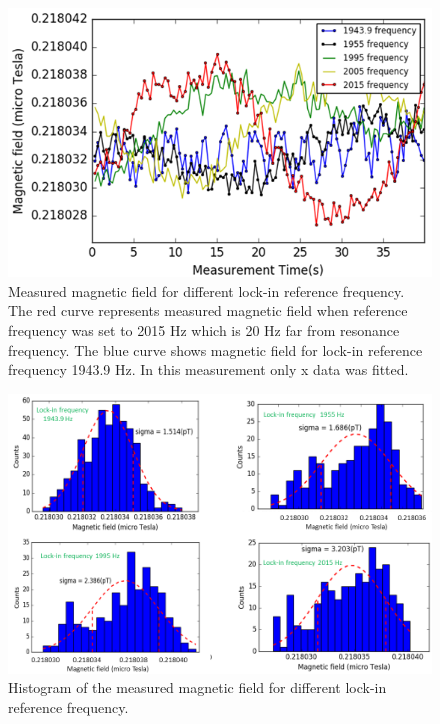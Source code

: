 \begin{figure}[h]
\centering\includegraphics[width=0.8\linewidth]{figures/reference_frequency}
\caption{Measured magnetic field for different lock-in reference frequency. The red curve represents measured magnetic field when reference frequency was set to 2015 Hz which is 20 Hz far from resonance frequency. The blue curve shows magnetic field for lock-in reference frequency 1943.9 Hz. In this measurement only x data was fitted. \label{fig:field for different lockin ref freq}}
\end{figure}
   

\begin{figure}[h]
\centering\includegraphics[width=0.8\linewidth]{figures/sigma_diff_lock-in_frequency.png}
\caption{Histogram of the measured magnetic field for different lock-in reference frequency.\label{histogram-of-diff-lock-in freq}}
\end{figure}

